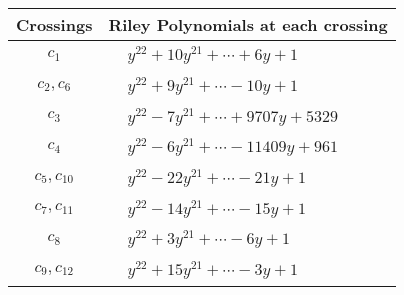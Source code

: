 \documentclass[1p]{elsarticle_modified}
\theoremstyle{definition}
\begin{document}
\begin{tabular}{m{50pt}|m{274pt}}
Crossings & \hspace{64pt}Riley Polynomials at each crossing \\
\hline $$\begin{aligned}c_{1}\end{aligned}$$&$\begin{aligned}
&y^{22}+10 y^{21}+\cdots+6 y+1
\end{aligned}$\\
\hline $$\begin{aligned}c_{2},c_{6}\end{aligned}$$&$\begin{aligned}
&y^{22}+9 y^{21}+\cdots-10 y+1
\end{aligned}$\\
\hline $$\begin{aligned}c_{3}\end{aligned}$$&$\begin{aligned}
&y^{22}-7 y^{21}+\cdots+9707 y+5329
\end{aligned}$\\
\hline $$\begin{aligned}c_{4}\end{aligned}$$&$\begin{aligned}
&y^{22}-6 y^{21}+\cdots-11409 y+961
\end{aligned}$\\
\hline $$\begin{aligned}c_{5},c_{10}\end{aligned}$$&$\begin{aligned}
&y^{22}-22 y^{21}+\cdots-21 y+1
\end{aligned}$\\
\hline $$\begin{aligned}c_{7},c_{11}\end{aligned}$$&$\begin{aligned}
&y^{22}-14 y^{21}+\cdots-15 y+1
\end{aligned}$\\
\hline $$\begin{aligned}c_{8}\end{aligned}$$&$\begin{aligned}
&y^{22}+3 y^{21}+\cdots-6 y+1
\end{aligned}$\\
\hline $$\begin{aligned}c_{9},c_{12}\end{aligned}$$&$\begin{aligned}
&y^{22}+15 y^{21}+\cdots-3 y+1
\end{aligned}$\\
\hline
\end{tabular}\\~\\
\end{document}
